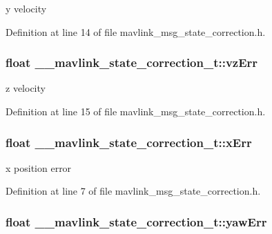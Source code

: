 y velocity 



Definition at line 14 of file mavlink\-\_\-msg\-\_\-state\-\_\-correction.\-h.

\hypertarget{struct____mavlink__state__correction__t_aad12e879c31e56d07fc0a4f95750e701}{
\subsubsection[{vz\-Err}]{\setlength{\rightskip}{0pt plus 5cm}float \-\_\-\-\_\-mavlink\-\_\-state\-\_\-correction\-\_\-t\-::vz\-Err}}\label{struct____mavlink__state__correction__t_aad12e879c31e56d07fc0a4f95750e701}


z velocity 



Definition at line 15 of file mavlink\-\_\-msg\-\_\-state\-\_\-correction.\-h.

\hypertarget{struct____mavlink__state__correction__t_ab1fca88ee199d11ec9dd9c58137ad629}{
\subsubsection[{x\-Err}]{\setlength{\rightskip}{0pt plus 5cm}float \-\_\-\-\_\-mavlink\-\_\-state\-\_\-correction\-\_\-t\-::x\-Err}}\label{struct____mavlink__state__correction__t_ab1fca88ee199d11ec9dd9c58137ad629}


x position error 



Definition at line 7 of file mavlink\-\_\-msg\-\_\-state\-\_\-correction.\-h.

\hypertarget{struct____mavlink__state__correction__t_a22e48f6296de1a6751c7be4df6442aa9}{
\subsubsection[{yaw\-Err}]{\setlength{\rightskip}{0pt plus 5cm}float \-\_\-\-\_\-mavlink\-\_\-state\-\_\-correction\-\_\-t\-::yaw\-Err}}\label{struct____mavlink__state__correction__t_a22e48f6296de1a6751c7be4df6442aa9}


